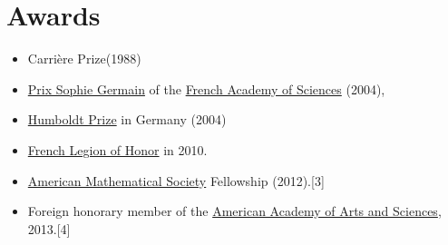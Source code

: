 \documentclass{book}
\numberwithin{equation}{section}
\begin{document}
\section{Awards}
\begin{itemize}
    \item Carrière Prize(1988)
    \item \href{https://en.wikipedia.org/wiki/Sophie_Germain#Sophie_Germain_Prize}{Prix Sophie Germain} of the \href{https://en.wikipedia.org/wiki/French_Academy_of_Sciences}{French Academy of Sciences} (2004),
    \item \href{https://en.wikipedia.org/wiki/Humboldt_Prize}{Humboldt Prize} in Germany (2004)
    \item \href{https://en.wikipedia.org/wiki/French_Legion_of_Honor}{French Legion of Honor} in 2010.
    \item \href{https://en.wikipedia.org/wiki/American_Mathematical_Society}{American Mathematical Society} Fellowship (2012).[3]
    \item Foreign honorary member of the \href{https://en.wikipedia.org/wiki/American_Academy_of_Arts_and_Sciences}{American Academy of Arts and Sciences}, 2013.[4]
\end{itemize}
\end{document}
